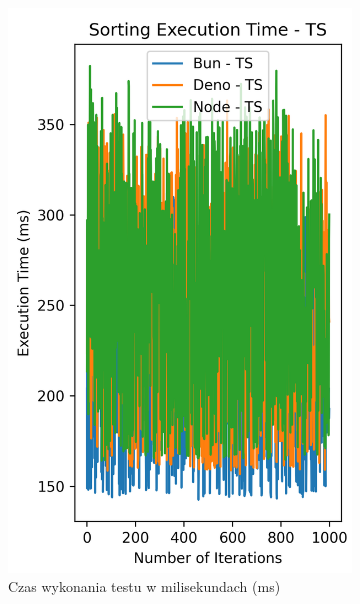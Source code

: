 \begin{figure}[H]
  \centering
  \begin{subfigure}[b]{0.4\textwidth}
    \centering
    \includegraphics[width=\textwidth]{Figures/sorting/sorting_bubble_1000_10000_ts_time.png}
    \caption{Czas wykonania testu w milisekundach (ms)}
    \label{fig:bubble_sorting_e4_ts_time}
  \end{subfigure}
  \begin{subfigure}[b]{0.4\textwidth}
    \centering

\end{subfigure}
\end{figure}
